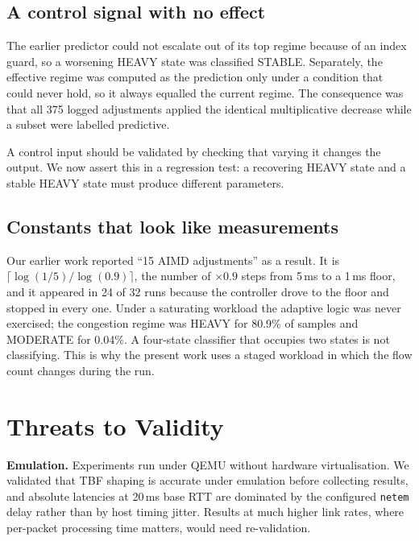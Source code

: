 \documentclass[conference]{IEEEtran}
\begin{document}
\subsection{A control signal with no effect}

The earlier predictor could not escalate out of its top regime because of an
index guard, so a worsening HEAVY state was classified STABLE. Separately, the
effective regime was computed as the prediction only under a condition that
could never hold, so it always equalled the current regime. The consequence was
that all 375 logged adjustments applied the identical multiplicative decrease
while a subset were labelled predictive.

A control input should be validated by checking that
varying it changes the output. We now assert this in a regression test:
a recovering HEAVY state and a stable HEAVY state must produce different
parameters.

\subsection{Constants that look like measurements}

Our earlier work reported ``15 AIMD adjustments'' as a result. It is
$\lceil \log(1/5)/\log(0.9) \rceil$, the number of $\times 0.9$ steps from
5\,ms to a 1\,ms floor, and it appeared in 24 of 32 runs because the controller
drove to the floor and stopped in every one. Under a saturating workload the
adaptive logic was never exercised; the congestion regime was HEAVY for 80.9\%
of samples and MODERATE for 0.04\%. A four-state classifier that occupies two
states is not classifying. This is why the present work uses a staged workload
in which the flow count changes during the run.



\section{Threats to Validity}

\textbf{Emulation.} Experiments run under QEMU without hardware
virtualisation. We validated that TBF shaping is accurate under emulation
before collecting results, and absolute latencies at 20\,ms base RTT are
dominated by the configured \texttt{netem} delay rather than by host timing
jitter. Results at much higher link rates, where per-packet processing time
matters, would need re-validation.
\end{document}

